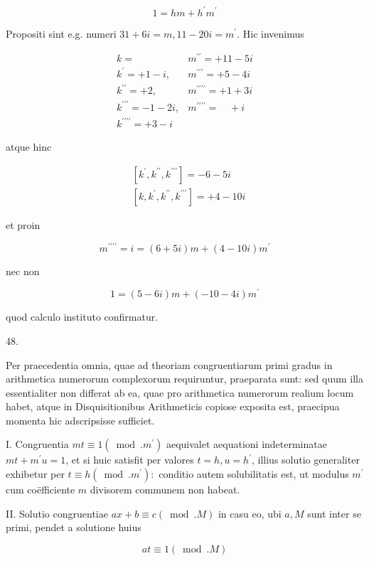 \documentclass[10pt]{article}
\begin{document}
\[
1=h m+h^{\prime} m^{\prime}
\]

Propositi sint e.g. numeri \(31+6 i=m, 11-20 i=m^{\prime}\). Hic invenimus

\[
\begin{array}{ll}
k= & m^{\prime \prime}=+11-5 i \\
k^{\prime}=+1-i, & m^{\prime \prime \prime}=+5-4 i \\
k^{\prime \prime}=+2, & m^{\prime \prime \prime \prime}=+1+3 i \\
k^{\prime \prime \prime}=-1-2 i, & m^{\prime \prime \prime \prime}=\quad+i \\
k^{\prime \prime \prime \prime}=+3-i &
\end{array}
\]

atque hinc

\[
\begin{aligned}
& {\left[k^{\prime}, k^{\prime \prime}, k^{\prime \prime \prime}\right]=-6-5 i} \\
& {\left[k, k^{\prime}, k^{\prime \prime}, k^{\prime \prime \prime}\right]=+4-10 i}
\end{aligned}
\]

et proin

\[
m^{\prime \prime \prime \prime}=i=(6+5 i) m+(4-10 i) m^{\prime}
\]

nec non

\[
1=(5-6 i) m+(-10-4 i) m^{\prime}
\]

quod calculo instituto confirmatur.

48.

Per praecedentia omnia, quae ad theoriam congruentiarum primi gradus in arithmetica numerorum complexorum requiruntur, praeparata sunt: sed quum illa
essentialiter non differat ab ea, quae pro arithmetica numerorum realium locum habet, atque in Disquisitionibus Arithmeticis copiose exposita est, praecipua momenta hic adscripsisse sufficiet.

I. Congruentia \(m t \equiv 1\left(\bmod . m^{\prime}\right)\) aequivalet aequationi indeterminatae \(m t+m^{\prime} u=1\), et si huic satisfit per valores \(t=h, u=h^{\prime}\), illius solutio generaliter exhibetur per \(t \equiv h\left(\bmod . m^{\prime}\right):\) conditio autem solubilitatis est, ut modulus \(m^{\prime}\) cum coëfficiente \(m\) divisorem communem non habeat.

II. Solutio congruentiae \(a x+b \equiv c(\bmod . M)\) in casu eo, ubi \(a, M\) sunt inter se primi, pendet a solutione huius

\[
a t \equiv 1(\bmod . M)
\]
\end{document}
